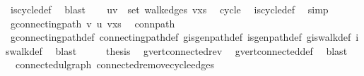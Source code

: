 \begin{isabellebody}
\ is{\isacharunderscore}{\kern0pt}cycle{}{\isacharunderscore}{\kern0pt}def\ \isamarkupfalse%
\ blast\isanewline
\ \ \isamarkupfalse%
\ {\isachardoublequoteopen}{\isacharbraceleft}{\kern0pt}u{\isacharcomma}{\kern0pt}v{\isacharbraceright}{\kern0pt}\ {\isasymnotin}\ set\ {\isacharparenleft}{\kern0pt}walk{\isacharunderscore}{\kern0pt}edges\ {\isacharparenleft}{\kern0pt}v{\isacharhash}{\kern0pt}xs{\isacharparenright}{\kern0pt}{\isacharparenright}{\kern0pt}{\isachardoublequoteclose}\ \isamarkupfalse%
\ cycle\ \isamarkupfalse%
\ is{\isacharunderscore}{\kern0pt}cycle{}{\isacharunderscore}{\kern0pt}def\ \isamarkupfalse%
\ simp\isanewline
\ \ \isamarkupfalse%
\ \isamarkupfalse%
\ {\isachardoublequoteopen}g{\isacharprime}{\kern0pt}{\isachardot}{\kern0pt}connecting{\isacharunderscore}{\kern0pt}path\ v\ u\ {\isacharparenleft}{\kern0pt}v{\isacharhash}{\kern0pt}xs{\isacharparenright}{\kern0pt}{\isachardoublequoteclose}\ \isamarkupfalse%
\ conn{\isacharunderscore}{\kern0pt}path\isanewline
\ \ \ \ \isamarkupfalse%
\ g{\isacharprime}{\kern0pt}{\isachardot}{\kern0pt}connecting{\isacharunderscore}{\kern0pt}path{\isacharunderscore}{\kern0pt}def\ connecting{\isacharunderscore}{\kern0pt}path{\isacharunderscore}{\kern0pt}def\ g{\isacharprime}{\kern0pt}{\isachardot}{\kern0pt}is{\isacharunderscore}{\kern0pt}gen{\isacharunderscore}{\kern0pt}path{\isacharunderscore}{\kern0pt}def\ is{\isacharunderscore}{\kern0pt}gen{\isacharunderscore}{\kern0pt}path{\isacharunderscore}{\kern0pt}def\ g{\isacharprime}{\kern0pt}{\isachardot}{\kern0pt}is{\isacharunderscore}{\kern0pt}walk{\isacharunderscore}{\kern0pt}def\ is{\isacharunderscore}{\kern0pt}walk{\isacharunderscore}{\kern0pt}def\ \isamarkupfalse%
\ blast\isanewline
\ \ \isamarkupfalse%
\ \isamarkupfalse%
\ {\isacharquery}{\kern0pt}thesis\ \isamarkupfalse%
\ g{\isacharprime}{\kern0pt}{\isachardot}{\kern0pt}vert{\isacharunderscore}{\kern0pt}connected{\isacharunderscore}{\kern0pt}rev\ \isamarkupfalse%
\ g{\isacharprime}{\kern0pt}{\isachardot}{\kern0pt}vert{\isacharunderscore}{\kern0pt}connected{\isacharunderscore}{\kern0pt}def\ \isamarkupfalse%
\ blast\isanewline
{}\isamarkupfalse%
%
\endisatagproof
{\isafoldproof}%
%
\isadelimproof
\isanewline
%
\endisadelimproof
\isanewline
{}\isamarkupfalse%
\ {\isacharparenleft}{\kern0pt}\ connected{\isacharunderscore}{\kern0pt}ulgraph{\isacharparenright}{\kern0pt}\ connected{\isacharunderscore}{\kern0pt}remove{\isacharunderscore}{\kern0pt}cycle{\isacharunderscore}{\kern0pt}edges{\isacharcolon}{\kern0pt}\isanewline

\end{isabellebody}
